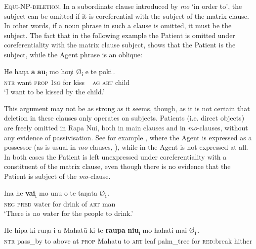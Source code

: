 \textsc{Equi-NP-deletion.} In a subordinate clause introduced by \textit{mo} ‘in order to’, the subject can be omitted if it is coreferential with the subject of the matrix clause. In other words, if a noun phrase in such a clause is omitted, it must be the subject. The fact that in the following example the Patient is omitted under coreferentiality with the matrix clause subject, shows that the Patient is the subject, while the Agent phrase is an oblique:

\ea\label{ex:8.48}
\gll He haŋa \textbf{a} \textbf{au}\textsubscript{\textup{i}} {\ob}mo hoŋi  \textup{Ø}\textsubscript{\textup{i}} e te poki\,{\cb}.\\
\textsc{ntr} want \textsc{prop} \textsc{1sg} {\db}for kiss ~ \textsc{ag} \textsc{art} child\\

\glt
‘I want to be kissed by the child.’  
\z

This argument may not be as strong as it seems, though, as it is not certain that deletion in these clauses only operates on subjects. Patients (i.e. direct objects) are freely omitted in Rapa Nui, both in main clauses and in \textit{mo}{}-clauses, without any evidence of passivisation. See for example , where the Agent is expressed as a possessor (as is usual in \textit{mo}{}-clauses, ), while in  the Agent is not expressed at all. In both cases the Patient is left unexpressed under coreferentiality with a constituent of the matrix clause, even though there is no evidence that the Patient is subject of the \textit{mo}{}-clause.

\ea\label{ex:8.49}
\gll {\ꞌ}Ina he \textbf{vai}\textsubscript{\textup{i}} {\ob}mo unu o te taŋata \textup{Ø}\textsubscript{\textup{i}}\,{\cb}.\\
\textsc{neg} \textsc{pred} water {\db}for drink of \textsc{art} man \\

\glt 
‘There is no water for the people to drink.’ \textstyleExampleref{[R372.013]} 
\z

\ea\label{ex:8.50}
\gll He hipa ki ruŋa i a Mahatū ki te \textbf{raupā} \textbf{niu}\textsubscript{\textup{i}}  {\ob}mo hahati mai \textup{Ø}\textsubscript{\textup{i}}\,{\cb}.\\
\textsc{ntr} pass\_by to above at \textsc{prop} Mahatu to \textsc{art} leaf palm\_tree {\db}for \textsc{red}:break hither \\

